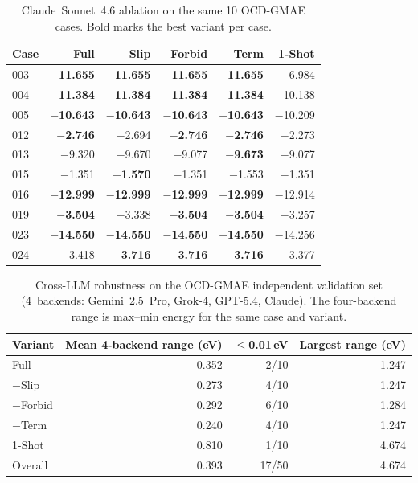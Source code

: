\begin{table}[t]
\centering
\small
\caption{Claude~Sonnet~4.6 ablation on the same 10 OCD-GMAE cases. Bold marks the best variant per case.}
\label{tab:ocd-ablation-claude-ocd}
\begin{tabular}{lrrrrr}
\toprule
Case & Full & $-$Slip & $-$Forbid & $-$Term & 1-Shot \\
\midrule
003 & \textbf{$-$11.655} & \textbf{$-$11.655} & \textbf{$-$11.655} & \textbf{$-$11.655} & $-$6.984 \\
004 & \textbf{$-$11.384} & \textbf{$-$11.384} & \textbf{$-$11.384} & \textbf{$-$11.384} & $-$10.138 \\
005 & \textbf{$-$10.643} & \textbf{$-$10.643} & \textbf{$-$10.643} & \textbf{$-$10.643} & $-$10.209 \\
012 & \textbf{$-$2.746} & $-$2.694 & \textbf{$-$2.746} & \textbf{$-$2.746} & $-$2.273 \\
013 & $-$9.320 & $-$9.670 & $-$9.077 & \textbf{$-$9.673} & $-$9.077 \\
015 & $-$1.351 & \textbf{$-$1.570} & $-$1.351 & $-$1.553 & $-$1.351 \\
016 & \textbf{$-$12.999} & \textbf{$-$12.999} & \textbf{$-$12.999} & \textbf{$-$12.999} & $-$12.914 \\
019 & \textbf{$-$3.504} & $-$3.338 & \textbf{$-$3.504} & \textbf{$-$3.504} & $-$3.257 \\
023 & \textbf{$-$14.550} & \textbf{$-$14.550} & \textbf{$-$14.550} & \textbf{$-$14.550} & $-$14.256 \\
024 & $-$3.418 & \textbf{$-$3.716} & \textbf{$-$3.716} & \textbf{$-$3.716} & $-$3.377 \\
\bottomrule
\end{tabular}
\end{table}

\begin{table}[t]
\centering
\caption{Cross-LLM robustness on the OCD-GMAE independent validation set (4~backends: Gemini~2.5~Pro, Grok-4, GPT-5.4, Claude). The four-backend range is max--min energy for the same case and variant.}
\label{tab:ocd-cross-llm}
\begin{tabular}{lrrr}
\toprule
Variant & Mean 4-backend range (eV) & $\leq$0.01\,eV & Largest range (eV) \\
\midrule
Full & 0.352 & 2/10 & 1.247 \\
$-$Slip & 0.273 & 4/10 & 1.247 \\
$-$Forbid & 0.292 & 6/10 & 1.284 \\
$-$Term & 0.240 & 4/10 & 1.247 \\
1-Shot & 0.810 & 1/10 & 4.674 \\
\midrule
Overall & 0.393 & 17/50 & 4.674 \\
\bottomrule
\end{tabular}
\end{table}
